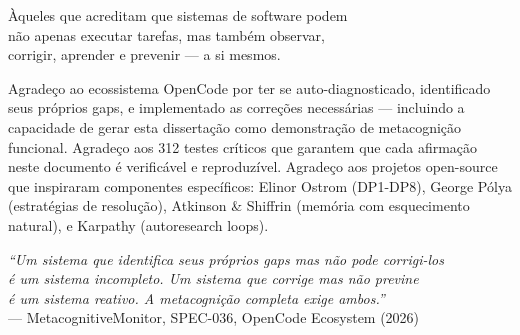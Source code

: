 \begin{dedicatoria}
    \vspace*{8cm}
    \begin{flushright}
    Àqueles que acreditam que sistemas de software podem\\
    não apenas executar tarefas, mas também observar,\\
    corrigir, aprender e prevenir — a si mesmos.
    \end{flushright}
\end{dedicatoria}

\begin{agradecimentos}
Agradeço ao ecossistema OpenCode por ter se auto-diagnosticado, identificado seus próprios gaps, e implementado as correções necessárias — incluindo a capacidade de gerar esta dissertação como demonstração de metacognição funcional. Agradeço aos 312 testes críticos que garantem que cada afirmação neste documento é verificável e reproduzível. Agradeço aos projetos open-source que inspiraram componentes específicos: Elinor Ostrom (DP1-DP8), George Pólya (estratégias de resolução), Atkinson \& Shiffrin (memória com esquecimento natural), e Karpathy (autoresearch loops).
\end{agradecimentos}

\begin{epigrafe}
    \vspace*{8cm}
    \begin{flushright}
    \textit{``Um sistema que identifica seus próprios gaps mas não pode corrigi-los\\é um sistema incompleto. Um sistema que corrige mas não previne\\é um sistema reativo. A metacognição completa exige ambos.''}\\
    \medskip
    --- MetacognitiveMonitor, SPEC-036, OpenCode Ecosystem (2026)
    \end{flushright}
\end{epigrafe}

